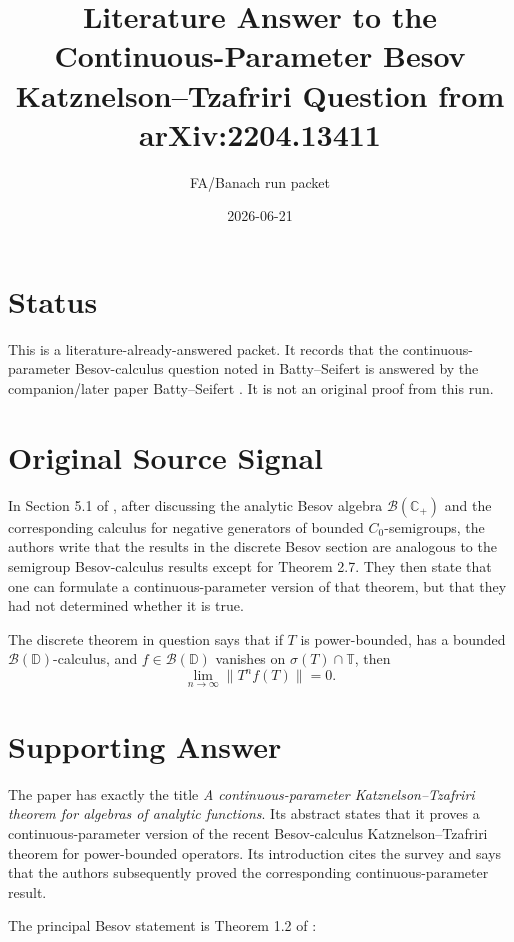 \documentclass[11pt]{article}
\title{Literature Answer to the Continuous-Parameter Besov Katznelson--Tzafriri Question from arXiv:2204.13411}
\author{FA/Banach run packet}
\date{2026-06-21}
\begin{document}
\maketitle

\section*{Status}

This is a literature-already-answered packet. It records that the
continuous-parameter Besov-calculus question noted in Batty--Seifert
\cite{BSsurvey} is answered by the companion/later paper
Batty--Seifert \cite{BScontinuous}. It is not an original proof from this run.

\section*{Original Source Signal}

In Section 5.1 of \cite{BSsurvey}, after discussing the analytic Besov algebra
\(\mathcal B(\mathbb C_+)\) and the corresponding calculus for negative
generators of bounded \(C_0\)-semigroups, the authors write that the results in
the discrete Besov section are analogous to the semigroup Besov-calculus
results except for Theorem 2.7. They then state that one can formulate a
continuous-parameter version of that theorem, but that they had not determined
whether it is true.

The discrete theorem in question says that if \(T\) is power-bounded, has a
bounded \(\mathcal B(\mathbb D)\)-calculus, and \(f\in \mathcal B(\mathbb D)\)
vanishes on \(\sigma(T)\cap\mathbb T\), then
\[
  \lim_{n\to\infty}\|T^n f(T)\|=0.
\]

\section*{Supporting Answer}

The paper \cite{BScontinuous} has exactly the title
\emph{A continuous-parameter Katznelson--Tzafriri theorem for algebras of
analytic functions}. Its abstract states that it proves a continuous-parameter
version of the recent Besov-calculus Katznelson--Tzafriri theorem for
power-bounded operators. Its introduction cites the survey \cite{BSsurvey} and
says that the authors subsequently proved the corresponding
continuous-parameter result.

The principal Besov statement is Theorem 1.2 of \cite{BScontinuous}:
\end{document}
